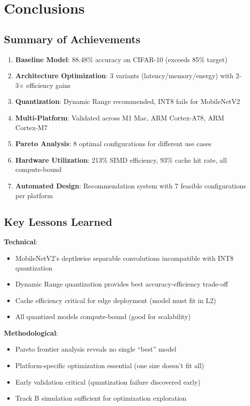 \documentclass[10pt, a4paper]{article}
\begin{document}
\section*{Conclusions}

\subsection{Summary of Achievements}

\begin{enumerate}
    \item \textbf{Baseline Model}: 88.48\% accuracy on CIFAR-10 (exceeds 85\% target)
    \item \textbf{Architecture Optimization}: 3 variants (latency/memory/energy) with 2-3× efficiency gains
    \item \textbf{Quantization}: Dynamic Range recommended, INT8 fails for MobileNetV2
    \item \textbf{Multi-Platform}: Validated across M1 Mac, ARM Cortex-A78, ARM Cortex-M7
    \item \textbf{Pareto Analysis}: 8 optimal configurations for different use cases
    \item \textbf{Hardware Utilization}: 213\% SIMD efficiency, 93\% cache hit rate, all compute-bound
    \item \textbf{Automated Design}: Recommendation system with 7 feasible configurations per platform
\end{enumerate}

\subsection{Key Lessons Learned}

\textbf{Technical}:
\begin{itemize}
    \item MobileNetV2's depthwise separable convolutions incompatible with INT8 quantization
    \item Dynamic Range quantization provides best accuracy-efficiency trade-off
    \item Cache efficiency critical for edge deployment (model must fit in L2)
    \item All quantized models compute-bound (good for scalability)
\end{itemize}

\textbf{Methodological}:
\begin{itemize}
    \item Pareto frontier analysis reveals no single ``best'' model
    \item Platform-specific optimization essential (one size doesn't fit all)
    \item Early validation critical (quantization failure discovered early)
    \item Track B simulation sufficient for optimization exploration
\end{itemize}
\end{document}
